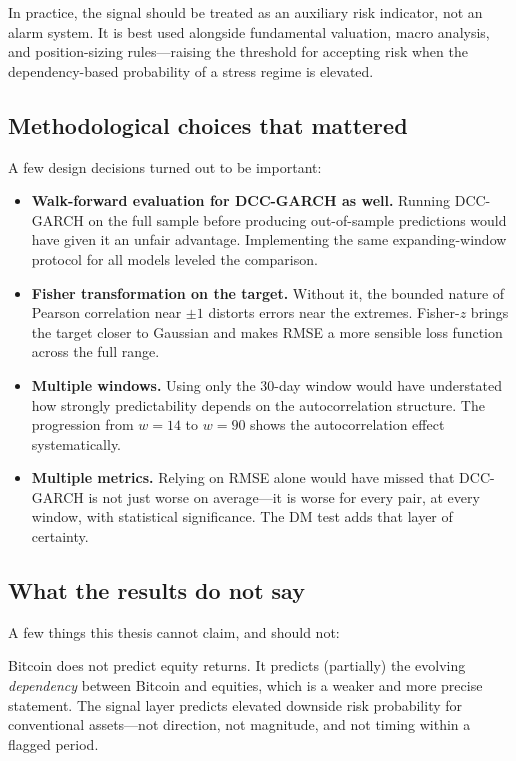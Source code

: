 In practice, the signal should be treated as an auxiliary risk indicator, not an alarm system. It is best used alongside fundamental valuation, macro analysis, and position-sizing rules---raising the threshold for accepting risk when the dependency-based probability of a stress regime is elevated.

\subsection{Methodological choices that mattered}

A few design decisions turned out to be important:

\begin{itemize}
    \item \textbf{Walk-forward evaluation for DCC-GARCH as well.} Running DCC-GARCH on the full sample before producing out-of-sample predictions would have given it an unfair advantage. Implementing the same expanding-window protocol for all models leveled the comparison.
    \item \textbf{Fisher transformation on the target.} Without it, the bounded nature of Pearson correlation near $\pm 1$ distorts errors near the extremes. Fisher-$z$ brings the target closer to Gaussian and makes RMSE a more sensible loss function across the full range.
    \item \textbf{Multiple windows.} Using only the 30-day window would have understated how strongly predictability depends on the autocorrelation structure. The progression from $w=14$ to $w=90$ shows the autocorrelation effect systematically.
    \item \textbf{Multiple metrics.} Relying on RMSE alone would have missed that DCC-GARCH is not just worse on average---it is worse for every pair, at every window, with statistical significance. The DM test adds that layer of certainty.
\end{itemize}

\subsection{What the results do not say}

A few things this thesis cannot claim, and should not:

Bitcoin does not predict equity returns. It predicts (partially) the evolving \emph{dependency} between Bitcoin and equities, which is a weaker and more precise statement. The signal layer predicts elevated downside risk probability for conventional assets---not direction, not magnitude, and not timing within a flagged period.


